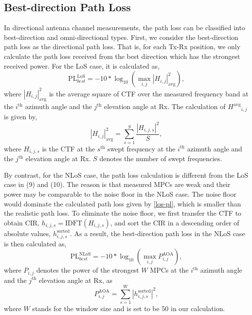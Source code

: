 \documentclass[journal,12pt,draftclsnofoot,onecolumn]{IEEEtran}
\begin{document}
\subsection{Best-direction Path Loss}
In directional antenna channel measurements, the path loss can be classified into best-direction and omni-directional types. First, we consider the best-direction path loss as the directional path loss. That is, for each Tx-Rx position, we only calculate the path loss received from the best direction which has the strongest received power. For the LoS case, it is calculated as,
\begin{equation}
    \text{PL}^{\text{LoS}}_{best}=-10*\log_{10}{(\max_{i,j}{|H_{i,j}|^2_{\text{avg}}})},
    \label{los-pl}
\end{equation}
where $|H_{i,j}|^2_{\text{avg}}$ is the average square of CTF over the measured frequency band at the $i^{\text{th}}$ azimuth angle and the $j^{\text{th}}$ elevation angle at Rx. The calculation of ${H^{\text{avg}}}_{i,j}$ is given by,
\begin{equation}
    {|H_{i,j}|^2_{\text{avg}}}=\sum_{s=1}^{S}\frac{|H_{i,j,s}|^2}{S},
\end{equation}
where $H_{i,j,s}$ is the CTF at the $s^{\text{th}}$ swept frequency at the $i^{\text{th}}$ azimuth angle and the $j^{\text{th}}$ elevation angle at Rx. $S$ denotes the number of swept frequencies.
\par By contrast, for the NLoS case, the path loss calculation is different from the LoS case in (9) and (10). The reason is that measured MPCs are weak and their power may be comparable to the noise floor in the NLoS case. The noise floor would dominate the calculated path loss given by \eqref{los-pl}, which is smaller than the realistic path loss. To eliminate the noise floor, we first transfer the CTF to obtain CIR, $h_{i,j,s}=\text{IDFT}(H_{i,j,s})$, and sort the CIR in a descending order of absolute values, $h^{\text{sorted}}_{i,j,s}$. As a result, the best-direction path loss in the NLoS case is then calculated as,
\begin{equation}
    \text{PL}^{\text{NLoS}}_{best}=-10*\log_{10}{(\max_{i,j}{P^{\text{AOA}}_{i,j}})},
\end{equation}
where $P_{i,j}$ denotes the power of the strongest $W$ MPCs at the $i^{\text{th}}$ azimuth angle and the $j^{\text{th}}$ elevation angle at Rx, as
\begin{equation}
    P^{\text{AOA}}_{i,j}=\sum_{s=1}^{W}|h_{i,j,s}^{\text{sorted}}|^2,
\end{equation}
where $W$ stands for the window size and is set to be 50 in our calculation.
\end{document}
